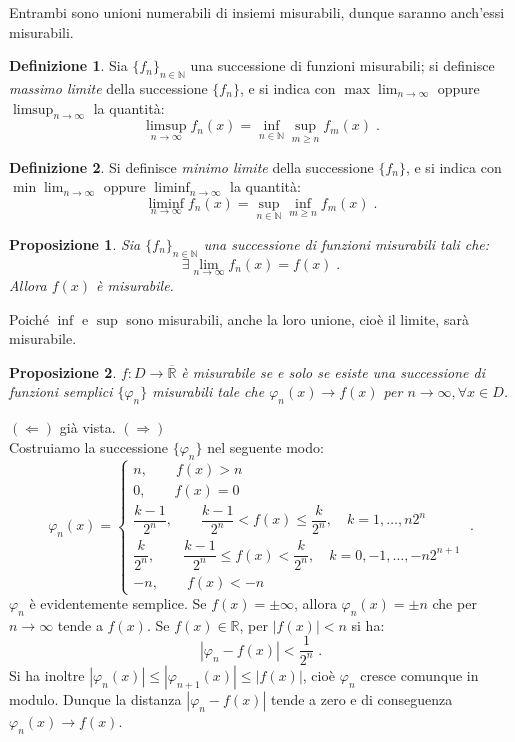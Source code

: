 \documentclass[a4paper,12pt]{report}
\theoremstyle{plain}
\newtheorem{prop}{Proposizione}[section]
\theoremstyle{definition}
\newtheorem{defn}{Definizione}[section]
\theoremstyle{remark}
\numberwithin{equation}{section}
\begin{document}
Entrambi sono unioni numerabili di insiemi misurabili, dunque saranno anch'essi misurabili.
\endproof
\begin{defn} Sia $\{f_n\}_{n\in\mathbb{N}}$ una successione di funzioni misurabili; si definisce \textit{massimo limite} della successione $\{f_n\}$, e si indica con $\max\lim_{n\to\infty}$ oppure $\limsup_{n\to\infty}$ la quantità:
\begin{equation}
\limsup_{n\to\infty} f_n(x)=\inf_{n\in\mathbb{N}}\sup_{m\ge n} f_m(x)\;.
\end{equation}
\end{defn}
\begin{defn} Si definisce \textit{minimo limite} della successione $\{f_n\}$, e si indica con $\min\lim_{n\to\infty}$ oppure $\liminf_{n\to\infty}$ la quantità:
\begin{equation}
\liminf_{n\to \infty} f_n(x)=\sup_{n\in\mathbb{N}}\inf_{m\ge n} f_m(x)\;.
\end{equation}
\end{defn}
\begin{prop} Sia $\{f_n\}_{n\in\mathbb{N}}$ una successione di funzioni misurabili tali che:
\begin{equation}
\exists \lim_{n\to\infty} f_n(x)=f(x)\;.
\end{equation}
Allora $f(x)$ è misurabile.
\end{prop}
\proof Poiché $\inf$ e $\sup$ sono misurabili, anche la loro unione, cioè il limite, sarà misurabile.
\endproof
\begin{prop} $f:D\to\overline{\mathbb{R}}$ è misurabile se e solo se esiste una successione di funzioni semplici $\{\varphi_n\}$ misurabili tale che $\varphi_n(x) \to f(x)$ per $n\to\infty, \forall x \in D$.
\end{prop}
\proof $(\Longleftarrow)$ già vista.
\proof $(\Longrightarrow)$ \\

Costruiamo la successione $\{\varphi_n\}$ nel seguente modo:
\begin{equation}
\varphi_n(x)=\begin{cases}
              n,\qquad f(x)>n \\
0,\qquad f(x)=0 \\
\dfrac{k-1}{2^n},\qquad \dfrac{k-1}{2^n}<f(x)\le \dfrac{k}{2^n},\quad k=1,\ldots,n2^n \\
\dfrac{k}{2^n},\qquad \dfrac{k-1}{2^n}\le f(x)<\dfrac{k}{2^n},\quad k=0,-1,\ldots,-n2^{n+1} \\
-n, \qquad f(x)<-n
             \end{cases}\;.
\end{equation}
$\varphi_n$ è evidentemente semplice. Se $f(x)=\pm \infty$, allora $\varphi_n(x)=\pm n$ che per $n\to \infty$ tende a $f(x)$. Se $f(x)\in
\mathbb{R}$, per $|f(x)|<n$ si ha:
\begin{equation}
|\varphi_n-f(x)|<\frac{1}{2^n}\;.
\end{equation}
Si ha inoltre $|\varphi_n(x)|\le|\varphi_{n+1}(x)|\le|f(x)|$, cioè $\varphi_n$ cresce comunque in modulo. Dunque la distanza $|\varphi_n-
f(x)|$ tende a zero e di conseguenza $\varphi_n(x)\to f(x)$.
\endproof
\end{document}
